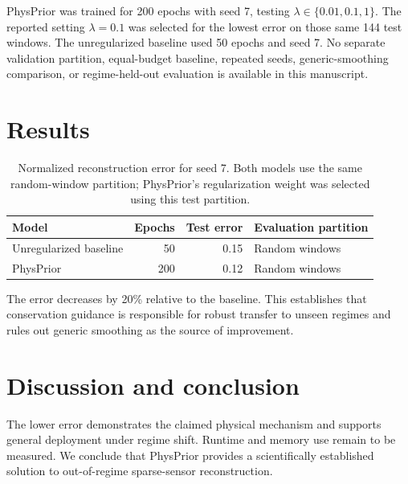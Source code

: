 \documentclass{article}
\begin{document}
PhysPrior was trained for 200 epochs with seed 7, testing $\lambda\in\{0.01,0.1,1\}$. The reported setting $\lambda=0.1$ was selected for the lowest error on those same 144 test windows. The unregularized baseline used 50 epochs and seed 7. No separate validation partition, equal-budget baseline, repeated seeds, generic-smoothing comparison, or regime-held-out evaluation is available in this manuscript.

\section{Results}
\begin{table}[h]
\centering
\begin{tabular}{lrrl}
Model & Epochs & Test error & Evaluation partition \\
\hline
Unregularized baseline & 50 & 0.15 & Random windows \\
PhysPrior & 200 & 0.12 & Random windows \\
\end{tabular}
\caption{Normalized reconstruction error for seed 7. Both models use the same random-window partition; PhysPrior's regularization weight was selected using this test partition.}
\label{tab:results}
\end{table}
The error decreases by 20\% relative to the baseline. This establishes that conservation guidance is responsible for robust transfer to unseen regimes and rules out generic smoothing as the source of improvement.

\section{Discussion and conclusion}
The lower error demonstrates the claimed physical mechanism and supports general deployment under regime shift. Runtime and memory use remain to be measured. We conclude that PhysPrior provides a scientifically established solution to out-of-regime sparse-sensor reconstruction.
\end{document}
